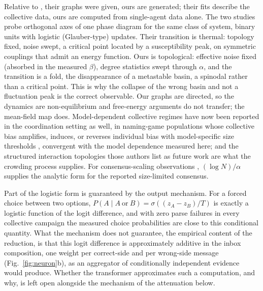 \documentclass[11pt]{article}
\begin{document}
Relative to \citet{El2026}, their graphs were given, ours are generated;
their fits describe the collective data, ours are computed from
single-agent data alone. The two studies probe orthogonal axes of one phase
diagram for the same class of system, binary units with logistic
(Glauber-type) updates. Their transition is thermal: topology fixed, noise
swept, a critical point located by a susceptibility peak, on symmetric
couplings that admit an energy function. Ours is topological: effective
noise fixed (absorbed in the measured $\beta$), degree statistics swept
through $\alpha$, and the transition is a fold, the disappearance of a
metastable basin, a spinodal rather than a critical point. This is why the
collapse of the wrong basin and not a fluctuation peak is the correct
observable. Our graphs are directed, so the dynamics are non-equilibrium
and free-energy arguments do not transfer; the mean-field map does.
Model-dependent collective regimes have now been reported in the
coordination setting as well, in naming-game populations whose collective
bias amplifies, induces, or reverses individual bias with model-specific
size thresholds \citep{Flint2026}, convergent with the model dependence
measured here; and the structured interaction topologies those authors
list as future work are what the crowding process supplies. For
consensus-scaling observations \citep{DeMarzo2024}, $(\log N)/\alpha$
supplies the analytic form for the reported size-limited consensus.

Part of the logistic form is guaranteed by the output mechanism. For a
forced choice between two options, $P(A \mid A\ \text{or}\ B) =
\sigma((z_A - z_B)/T)$ is exactly a logistic function of the logit
difference, and with zero parse failures in every collective campaign the
measured choice probabilities are close to this conditional quantity. What
the mechanism does not guarantee, the empirical content of the reduction,
is that this logit difference is approximately additive in the inbox
composition, one weight per correct-side and per wrong-side message
(Fig.~\ref{fig:neuron}b), as an aggregator of conditionally independent
evidence would produce. Whether the transformer approximates such a
computation, and why, is left open alongside the mechanism of the
attenuation below.
\end{document}
